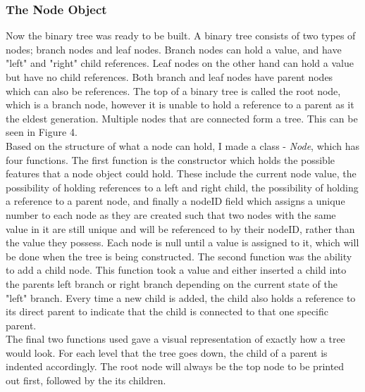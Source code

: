 \documentclass[11pt]{article}
\begin{document}
\subsubsection{The Node Object}
Now the binary tree was ready to be built. A binary tree consists of two types of nodes; branch nodes and leaf nodes. Branch nodes can hold a value, and have "left" and "right" child references. Leaf nodes on the other hand can hold a value but have no child references. Both branch and leaf nodes have parent nodes which can also be references. The top of a binary tree is called the root node, which is a branch node, however it is unable to hold a reference to a parent as it the eldest generation. Multiple nodes that are connected form a tree. This can be seen in Figure 4.  \\
Based on the structure of what a node can hold, I made a class - \textit{Node}, which has four functions. The first function is the constructor which holds the possible features that a node object could hold. These include the current node value, the possibility of holding references to a left and right child, the possibility of holding a reference to a parent node, and finally a nodeID field which assigns a unique number to each node as they are created such that two nodes with the same value in it are still unique and will be referenced to by their nodeID, rather than the value they possess. Each node is null until a value is assigned to it, which will be done when the tree is being constructed. The second function was the ability to add a child node.
This function took a value and either inserted a child into the parents left branch or right branch depending on the current state of the "left" branch. Every time a new child is added, the child also holds a reference to its direct parent to indicate that the child is connected to that one specific parent.\\
The final two functions used gave a visual representation of exactly how a tree would look. For each level that the tree goes down, the child of a parent is indented accordingly. The root node will always be the top node to be printed out first, followed by the its children. 
\end{document}
